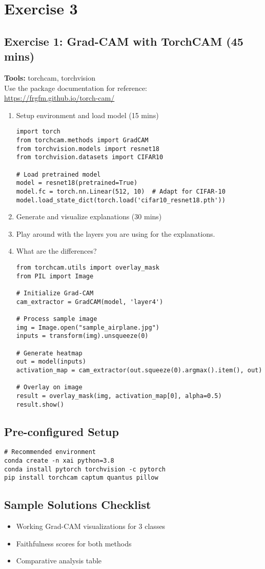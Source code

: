 \chapter*{Exercise 3}
\section*{Exercise 1: Grad-CAM with TorchCAM (45 mins)}
\textbf{Tools:} torchcam, torchvision \\
Use the package documentation for reference: \\
\url{https://frgfm.github.io/torch-cam/}

\begin{enumerate}
\item Setup environment and load model (15 mins)
\begin{verbatim}
import torch
from torchcam.methods import GradCAM
from torchvision.models import resnet18
from torchvision.datasets import CIFAR10

# Load pretrained model
model = resnet18(pretrained=True)
model.fc = torch.nn.Linear(512, 10)  # Adapt for CIFAR-10
model.load_state_dict(torch.load('cifar10_resnet18.pth'))
\end{verbatim}

\item Generate and visualize explanations (30 mins)
\item Play around with the layers you are using for the explanations.
\item What are the differences?
\begin{verbatim}
from torchcam.utils import overlay_mask
from PIL import Image

# Initialize Grad-CAM
cam_extractor = GradCAM(model, 'layer4')

# Process sample image
img = Image.open("sample_airplane.jpg")
inputs = transform(img).unsqueeze(0)

# Generate heatmap
out = model(inputs)
activation_map = cam_extractor(out.squeeze(0).argmax().item(), out)

# Overlay on image
result = overlay_mask(img, activation_map[0], alpha=0.5)
result.show()
\end{verbatim}
\end{enumerate}

\section*{Pre-configured Setup}
\begin{verbatim}
# Recommended environment
conda create -n xai python=3.8
conda install pytorch torchvision -c pytorch
pip install torchcam captum quantus pillow
\end{verbatim}

\section*{Sample Solutions Checklist}
\begin{itemize}
\item [ ] Working Grad-CAM visualizations for 3 classes
\item [ ] Faithfulness scores for both methods
\item [ ] Comparative analysis table
\end{itemize}
